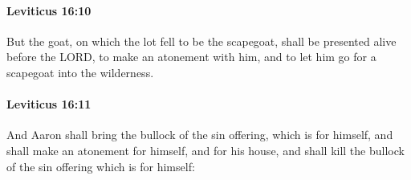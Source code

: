 		\paragraph{Leviticus 16:10} %
			\label{LEVITICUS-16-10}

			But the goat, on which the lot fell to be the scapegoat, shall be presented alive before the LORD, to make an atonement with him, and to let him go for a scapegoat into the wilderness.


		\paragraph{Leviticus 16:11} %
			\label{LEVITICUS-16-11}

			And Aaron shall bring the bullock of the sin offering, which is for himself, and shall make an atonement for himself, and for his house, and shall kill the bullock of the sin offering which is for himself:

